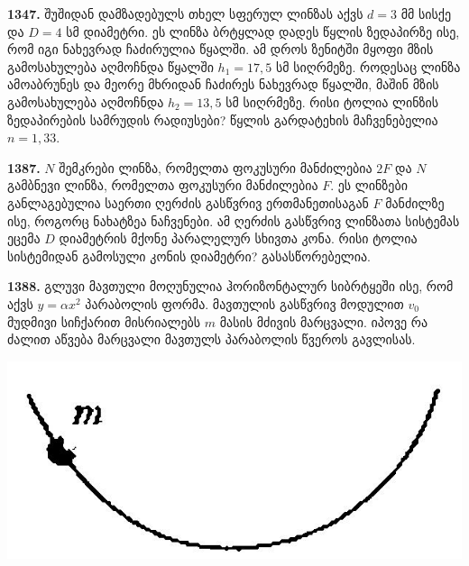 \documentclass[12pt,a4paper,]{report}
\begin{document}
\textbf{1347.} შუშიდან დამზადებულს თხელ სფერულ ლინზას აქვს $d=3$ მმ სისქე და $D=4$ სმ დიამეტრი. ეს ლინზა ბრტყლად დადეს წყლის ზედაპირზე ისე, რომ იგი ნახევრად ჩაძირულია წყალში. ამ დროს ზენიტში მყოფი მზის გამოსახულება აღმოჩნდა წყალში $h_1=17,5$ სმ სიღრმეზე. როდესაც ლინზა ამოაბრუნეს და  მეორე მხრიდან ჩაძირეს ნახევრად წყალში, მაშინ მზის გამოსახულება აღმოჩნდა $h_2=13,5$ სმ სიღრმეზე. რისი ტოლია ლინზის ზედაპირების სამრუდის რადიუსები? წყლის გარდატეხის მაჩვენებელია $n=1,33$.

\textbf{1387.} $N$ შემკრები ლინზა, რომელთა ფოკუსური მანძილებია $2F$ და $N$ გამბნევი ლინზა, რომელთა ფოკუსური მანძილებია $F$. ეს ლინზები განლაგებულია საერთი ღერძის გასწვრივ ერთმანეთისაგან $F$ მანძილზე ისე, როგორც ნახატზეა ნაჩვენები. ამ ღერძის გასწვრივ ლინზათა სისტემას ეცემა $D$ დიამეტრის მქონე პარალელურ სხივთა კონა. რისი ტოლია სისტემიდან გამოსული კონის დიამეტრი? გასასწორებელია. 
		
\textbf{1388.} გლუვი მავთული მოღუნულია ჰორიზონტალურ სიბრტყეში ისე, რომ აქვს $y=\alpha x^2$ პარაბოლის ფორმა. მავთულის გასწვრივ მოდულით $v_0$ მუდმივი   სიჩქარით მისრიალებს $m$ მასის მძივის მარცვალი. იპოვე რა ძალით აწვება მარცვალი მავთულს პარაბოლის წვეროს გავლისას.                            
		\begin{center}
			\includegraphics[scale=0.2]{images/F1388.jpg}
		\end{center}
\end{document}
